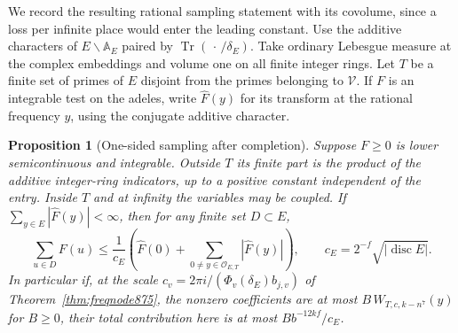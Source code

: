 \documentclass[a4paper,11pt]{article}
\newtheorem{proposition}{Proposition}[section]
\theoremstyle{definition}
\theoremstyle{remark}
\numberwithin{equation}{section}
\begin{document}
We record the resulting rational sampling statement with its
covolume, since a loss per infinite place would enter the
leading constant. Use the additive characters of \(E\backslash
\mathbb A_E\) paired by \(\operatorname{Tr}(\,\cdot\,/\delta_E)\).
Take ordinary Lebesgue measure at the complex embeddings and
volume one on all finite integer rings. Let \(T\) be a finite
set of primes of \(E\) disjoint from the primes belonging to
\(\mathcal V\). If \(F\) is an integrable test on the adeles,
write \(\widehat F(y)\) for its transform at the rational
frequency \(y\), using the conjugate additive character.

\begin{proposition}[One-sided sampling after completion]
\leavevmode\label{prop:sampling889}
Suppose \(F\ge0\) is lower semicontinuous and integrable. Outside
\(T\) its finite part is the product of the additive integer-ring
indicators, up to a positive constant independent of the entry.
Inside \(T\) and at infinity the variables may be coupled.
If \(\sum_{y\in E}|\widehat F(y)|<\infty\), then for any finite
set \(D\subset E\),
\[
 \sum_{u\in D} F(u)
 \le \frac1{c_E}\left(\widehat F(0)+
         \sum_{0\ne y\in\mathcal O_{E,T}}|\widehat F(y)|\right),
 \qquad c_E=2^{-f}\sqrt{|\operatorname{disc}E|}.
\]
In particular if, at the scale \(c_v=2\pi i/
(\Phi_v(\delta_E)b_{j,v})\) of Theorem~\ref{thm:freqnode875},
the nonzero coefficients are at most \(B\,W_{T,c,k-n^7}(y)\)
for \(B\ge0\), their total contribution here is at most
\(B b^{-12kf}/c_E\).
\end{proposition}
\end{document}
